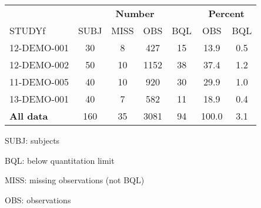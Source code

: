 \setlength{\tabcolsep}{5pt}
\begin{threeparttable}
\renewcommand\arraystretch{1.3}
\begin{tabular}[h]{lcccccc}
\hline
\multicolumn{1}{c}{} & \multicolumn{4}{c}{\textbf{Number}} & \multicolumn{2}{c}{\textbf{Percent}}\\
\cmidrule(lr){2-5}
\cmidrule(lr){6-7}
STUDYf & SUBJ & MISS & OBS & BQL & OBS & BQL \\
\hline
12-DEMO-001 & 30 & 8 & 427 & 15 & 13.9 & 0.5 \\
12-DEMO-002 & 50 & 10 & 1152 & 38 & 37.4 & 1.2 \\
11-DEMO-005 & 40 & 10 & 920 & 30 & 29.9 & 1.0 \\
13-DEMO-001 & 40 & 7 & 582 & 11 & 18.9 & 0.4 \\
\hline \hline {\bf All data} & 160 & 35 & 3081 & 94 & 100.0 & 3.1 \\
\hline
\end{tabular}
\begin{tablenotes}[flushleft]
\item SUBJ: subjects
\item BQL: below quantitation limit
\item MISS: missing observations (not BQL)
\item OBS: observations
\end{tablenotes}
\end{threeparttable}
